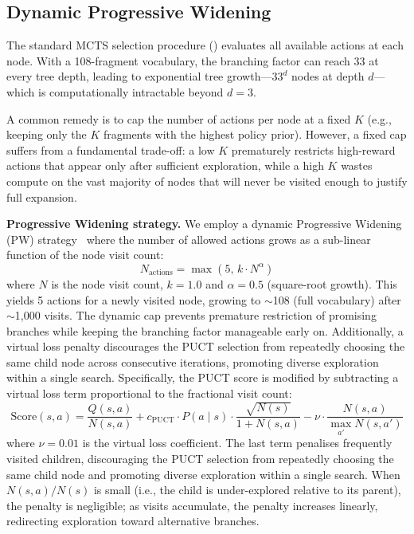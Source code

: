 \documentclass[jcim,article,layout=manuscript]{achemso}
\begin{document}
\subsection{Dynamic Progressive Widening}
\label{sec:pw}

The standard MCTS selection procedure () evaluates all
available actions at each node. With a 108-fragment vocabulary, the
branching factor can reach 33 at every tree depth, leading to
exponential tree growth---$33^{d}$ nodes at depth $d$---which is
computationally intractable beyond $d=3$.

A common remedy is to cap the number of actions per node at a fixed
$K$ (e.g., keeping only the $K$ fragments with the highest policy
prior). However, a fixed cap suffers from a fundamental trade-off:
a low $K$ prematurely restricts high-reward actions that appear only
after sufficient exploration, while a high $K$ wastes compute on the
vast majority of nodes that will never be visited enough to justify
full expansion.

\textbf{Progressive Widening strategy.} We employ a dynamic Progressive
Widening (PW) strategy~\cite{Coulom2006} where the number of
allowed actions grows as a sub-linear function of the node visit count:
\begin{equation}
  N_{\text{actions}} = \max\left(5,\, k \cdot N^{\alpha}\right)
  \label{eq:pw}
\end{equation}
where $N$ is the node visit count, $k=1.0$ and $\alpha=0.5$
(square-root growth). This yields 5 actions for a newly visited node,
growing to $\sim$108 (full vocabulary) after $\sim$1{,}000 visits. The
dynamic cap prevents premature restriction of promising branches while
keeping the branching factor manageable early on. Additionally, a
virtual loss penalty discourages the PUCT selection from
repeatedly choosing the same child node across consecutive iterations,
promoting diverse exploration within a single search. Specifically, the
PUCT score is modified by subtracting a virtual loss term proportional to
the fractional visit count:
\begin{equation}
  \text{Score}(s,a) = \frac{Q(s,a)}{N(s,a)} +
  c_{\text{PUCT}} \cdot P(a\mid s)
  \cdot \frac{\sqrt{N(s)}}{1 + N(s,a)}
  - \nu \cdot \frac{N(s,a)}{\max_{a'} N(s,a')}
  \label{eq:vl}
\end{equation}
where $\nu=0.01$ is the virtual loss coefficient. The last term penalises
frequently visited children, discouraging the PUCT selection from repeatedly
choosing the same child node and promoting diverse exploration within a
single search. When $N(s,a)/N(s)$ is small (i.e., the child is
under-explored relative to its parent), the penalty is negligible; as
visits accumulate, the penalty increases linearly, redirecting exploration
toward alternative branches.
\end{document}

